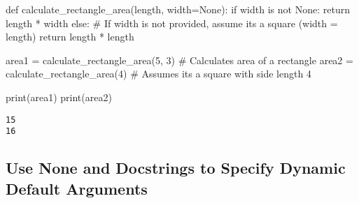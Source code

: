 \documentclass[
]{report}
\newenvironment{Shaded}{\begin{snugshade}}{\end{snugshade}}
\newcommand{\BuiltInTok}[1]{\textcolor[rgb]{0.00,0.23,0.31}{#1}}
\newcommand{\CommentTok}[1]{\textcolor[rgb]{0.37,0.37,0.37}{#1}}
\newcommand{\ControlFlowTok}[1]{\textcolor[rgb]{0.00,0.23,0.31}{#1}}
\newcommand{\DecValTok}[1]{\textcolor[rgb]{0.68,0.00,0.00}{#1}}
\newcommand{\KeywordTok}[1]{\textcolor[rgb]{0.00,0.23,0.31}{#1}}
\newcommand{\NormalTok}[1]{\textcolor[rgb]{0.00,0.23,0.31}{#1}}
\newcommand{\OperatorTok}[1]{\textcolor[rgb]{0.37,0.37,0.37}{#1}}
\newcommand{\VariableTok}[1]{\textcolor[rgb]{0.07,0.07,0.07}{#1}}
\begin{document}
\begin{Shaded}
\begin{Highlighting}[]
\KeywordTok{def}\NormalTok{ calculate\_rectangle\_area(length, width}\OperatorTok{=}\VariableTok{None}\NormalTok{):}
    \ControlFlowTok{if}\NormalTok{ width }\KeywordTok{is} \KeywordTok{not} \VariableTok{None}\NormalTok{:}
        \ControlFlowTok{return}\NormalTok{ length }\OperatorTok{*}\NormalTok{ width}
    \ControlFlowTok{else}\NormalTok{:}
        \CommentTok{\# If width is not provided, assume it\textquotesingle{}s a square (width = length)}
        \ControlFlowTok{return}\NormalTok{ length }\OperatorTok{*}\NormalTok{ length}
\end{Highlighting}
\end{Shaded}

\begin{Shaded}
\begin{Highlighting}[]
\NormalTok{area1 }\OperatorTok{=}\NormalTok{ calculate\_rectangle\_area(}\DecValTok{5}\NormalTok{, }\DecValTok{3}\NormalTok{)  }\CommentTok{\# Calculates area of a rectangle}
\NormalTok{area2 }\OperatorTok{=}\NormalTok{ calculate\_rectangle\_area(}\DecValTok{4}\NormalTok{)     }\CommentTok{\# Assumes it\textquotesingle{}s a square with side length 4}

\BuiltInTok{print}\NormalTok{(area1)}
\BuiltInTok{print}\NormalTok{(area2)}
\end{Highlighting}
\end{Shaded}

\begin{verbatim}
15
16
\end{verbatim}

\hypertarget{use-none-and-docstrings-to-specify-dynamic-default-arguments}{%
\subsection{Use None and Docstrings to Specify Dynamic Default
Arguments}\label{use-none-and-docstrings-to-specify-dynamic-default-arguments}}
\end{document}
